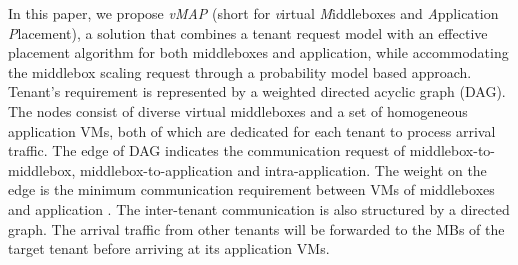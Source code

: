 \documentclass[review]{elsarticle}
\begin{document}
In this paper, we propose \emph{vMAP} (short for \emph{v}irtual \emph{M}iddleboxes and \emph{A}pplication \emph{P}lacement),
a solution that combines a tenant request model with an effective placement algorithm for both middleboxes and application, while accommodating the middlebox scaling request through a probability model based approach.  
Tenant's requirement is represented by a weighted directed acyclic graph (DAG). The nodes consist of diverse virtual middleboxes and a set of homogeneous application VMs, both of which are dedicated for each tenant to process arrival traffic. The edge of DAG indicates the communication request of middlebox-to-middlebox, middlebox-to-application and intra-application. The weight on the edge is the minimum communication requirement between VMs of middleboxes and application \cite{stratos12, B11tpd}. The inter-tenant communication \cite{B13cta} is also structured by a directed graph. The arrival traffic from other tenants will be forwarded to the MBs of the target tenant before arriving at its application VMs.
\end{document}
